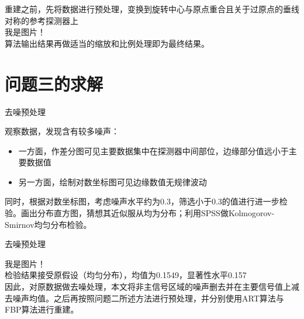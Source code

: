\documentclass{beamer}
\begin{document}
  
  
\begin{frame}
	  
	重建之前，先将数据进行预处理，变换到旋转中心与原点重合且关于过原点的垂线对称的参考探测器上\\
	  
	我是图片！\\
	  
	算法输出结果再做适当的缩放和比例处理即为最终结果。
	  
\end{frame}
  
  
  
\section{问题三的求解}
  
  
  
\begin{frame}{去噪预处理}
	  
	观察数据，发现含有较多噪声：
	  
	\begin{itemize}
		  
		\item 一方面，作差分图可见主要数据集中在探测器中间部位，边缘部分值远小于主要数据值
		        
		\item 另一方面，绘制对数坐标图可见边缘数值无规律波动
		        
	\end{itemize}
	  
	同时，根据对数坐标图，考虑噪声水平约为0.3，筛选小于0.3的值进行进一步检验。画出分布直方图，猜想其近似服从均为分布；利用SPSS做Kolmogorov-Smirnov均匀分布检验。
	  
\end{frame}
  
  
  
\begin{frame}{去噪预处理}
	  
	我是图片！\\
	  
	检验结果接受原假设（均匀分布），均值为0.1549，显著性水平0.157\\
	  
	因此，对原数据做去噪处理，本文将非主信号区域的噪声删去并在主要信号值上减去噪声均值。之后再按照问题二所述方法进行预处理，并分别使用ART算法与FBP算法进行重建。
	  
\end{frame}
  
\end{document}
